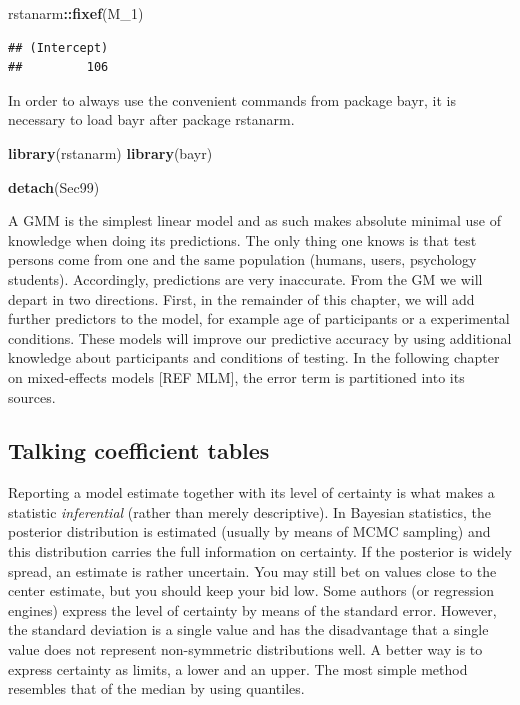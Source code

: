 \documentclass[]{svmono}
\newenvironment{Shaded}{\begin{snugshade}}{\end{snugshade}}
\newcommand{\KeywordTok}[1]{\textcolor[rgb]{0.13,0.29,0.53}{\textbf{#1}}}
\newcommand{\DecValTok}[1]{\textcolor[rgb]{0.00,0.00,0.81}{#1}}
\newcommand{\OperatorTok}[1]{\textcolor[rgb]{0.81,0.36,0.00}{\textbf{#1}}}
\newcommand{\NormalTok}[1]{#1}
\begin{document}
\begin{Shaded}
\begin{Highlighting}[]
\NormalTok{rstanarm}\OperatorTok{::}\KeywordTok{fixef}\NormalTok{(M_}\DecValTok{1}\NormalTok{)}
\end{Highlighting}
\end{Shaded}

\begin{verbatim}
## (Intercept) 
##         106
\end{verbatim}

In order to always use the convenient commands from package bayr, it is
necessary to load bayr after package rstanarm.

\begin{Shaded}
\begin{Highlighting}[]
\KeywordTok{library}\NormalTok{(rstanarm)}
\KeywordTok{library}\NormalTok{(bayr)}
\end{Highlighting}
\end{Shaded}

\begin{Shaded}
\begin{Highlighting}[]
\KeywordTok{detach}\NormalTok{(Sec99)}
\end{Highlighting}
\end{Shaded}

A GMM is the simplest linear model and as such makes absolute minimal
use of knowledge when doing its predictions. The only thing one knows is
that test persons come from one and the same population (humans, users,
psychology students). Accordingly, predictions are very inaccurate. From
the GM we will depart in two directions. First, in the remainder of this
chapter, we will add further predictors to the model, for example age of
participants or a experimental conditions. These models will improve our
predictive accuracy by using additional knowledge about participants and
conditions of testing. In the following chapter on mixed-effects models
{[}REF MLM{]}, the error term is partitioned into its sources.

\subsection{Talking coefficient
tables}\label{talking-coefficient-tables}

Reporting a model estimate together with its level of certainty is what
makes a statistic \emph{inferential} (rather than merely descriptive).
In Bayesian statistics, the posterior distribution is estimated (usually
by means of MCMC sampling) and this distribution carries the full
information on certainty. If the posterior is widely spread, an estimate
is rather uncertain. You may still bet on values close to the center
estimate, but you should keep your bid low. Some authors (or regression
engines) express the level of certainty by means of the standard error.
However, the standard deviation is a single value and has the
disadvantage that a single value does not represent non-symmetric
distributions well. A better way is to express certainty as limits, a
lower and an upper. The most simple method resembles that of the median
by using quantiles.
\end{document}
